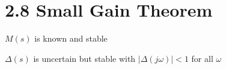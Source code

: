 \section*{2.8 Small Gain Theorem}


\(M(s)\) is known and stable

\(\Delta(s)\) is uncertain but stable with \( |\Delta(j\omega)| < 1 \) for all \( \omega \)

